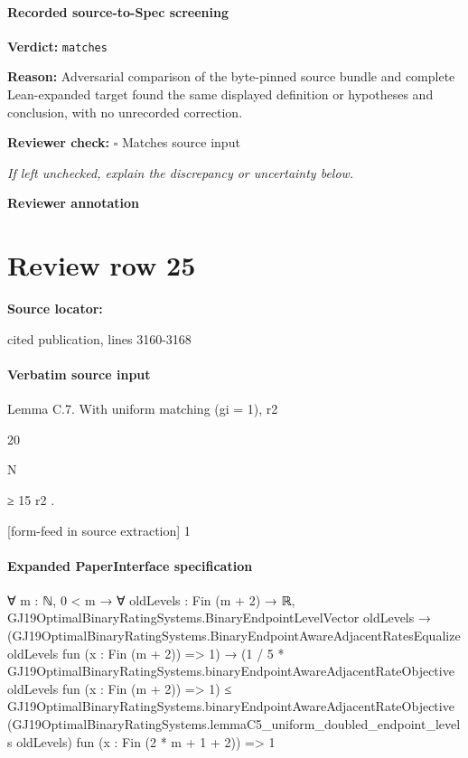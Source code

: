 \documentclass[10pt]{article}
\newcommand{\reviewerbox}{%
  \par\noindent\fbox{\parbox{0.96\linewidth}{\rule{0pt}{0.38in}}}\par
}
\newcommand{\reviewmatch}[1]{%
  \par\noindent\textbf{Reviewer check:} $\square$\; #1\par
  \noindent\emph{If left unchecked, explain the discrepancy or uncertainty below.}\par
}
\begin{document}
\paragraph{Recorded source-to-Spec screening}
\textbf{Verdict:} \texttt{matches}
\\
{\raggedright
\textbf{Reason:} Adversarial comparison of the byte-\allowbreak{}pinned source bundle and complete Lean-\allowbreak{}expanded target found the same displayed definition or hypotheses and conclusion, with no unrecorded correction.\allowbreak{}
\par}
\reviewmatch{Matches source input}
\noindent\textbf{Reviewer annotation}\par
\reviewerbox
\clearpage
\hypertarget{source-claim-2d8e50cd70ac2429}{}
\section*{Review row 25}
\textbf{Source locator:} {\footnotesize\raggedright cited publication, lines 3160-\allowbreak{}3168\par}
\paragraph{Verbatim source input}
\begin{ReviewVerbatim}
Lemma C.7. With uniform matching (gi = 1), r2

20

N

≥ 15 r2 .


[form-feed in source extraction]
1
\end{ReviewVerbatim}



\paragraph{Expanded PaperInterface specification}
\begin{ReviewVerbatim}
∀ {m : ℕ},
  0 < m →
    ∀ {oldLevels : Fin (m + 2) → ℝ},
      GJ19OptimalBinaryRatingSystems.BinaryEndpointLevelVector oldLevels →
        (GJ19OptimalBinaryRatingSystems.BinaryEndpointAwareAdjacentRatesEqualize oldLevels fun (x : Fin (m + 2)) => 1) →
          (1 / 5 *
              GJ19OptimalBinaryRatingSystems.binaryEndpointAwareAdjacentRateObjective oldLevels fun (x : Fin (m + 2)) =>
                1) ≤
            GJ19OptimalBinaryRatingSystems.binaryEndpointAwareAdjacentRateObjective
              (GJ19OptimalBinaryRatingSystems.lemmaC5_uniform_doubled_endpoint_levels oldLevels)
              fun (x : Fin (2 * m + 1 + 2)) => 1
\end{ReviewVerbatim}
\end{document}

